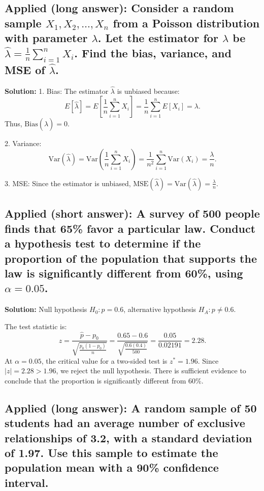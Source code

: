 \documentclass[12pt]{article}
\begin{document}
\subsection{Applied (long answer): Consider a random sample \( X_1, X_2, \dots, X_n \) from a Poisson distribution with parameter \( \lambda \). Let the estimator for \( \lambda \) be \( \hat{\lambda} = \frac{1}{n} \sum_{i=1}^{n} X_i \). Find the bias, variance, and MSE of \( \hat{\lambda} \).}

\textbf{Solution:}  
1. Bias:  
The estimator \( \hat{\lambda} \) is unbiased because:
\[
E[\hat{\lambda}] = E\left[ \frac{1}{n} \sum_{i=1}^{n} X_i \right] = \frac{1}{n} \sum_{i=1}^{n} E[X_i] = \lambda.
\]
Thus, \( \text{Bias}(\hat{\lambda}) = 0 \).

2. Variance:
\[
\text{Var}(\hat{\lambda}) = \text{Var}\left( \frac{1}{n} \sum_{i=1}^{n} X_i \right) = \frac{1}{n^2} \sum_{i=1}^{n} \text{Var}(X_i) = \frac{\lambda}{n}.
\]

3. MSE:
Since the estimator is unbiased, \( \text{MSE}(\hat{\lambda}) = \text{Var}(\hat{\lambda}) = \frac{\lambda}{n} \).

\subsection{Applied (short answer): A survey of 500 people finds that 65\% favor a particular law. Conduct a hypothesis test to determine if the proportion of the population that supports the law is significantly different from 60\%, using \( \alpha = 0.05 \).}

\textbf{Solution:}  
Null hypothesis \( H_0: p = 0.6 \), alternative hypothesis \( H_A: p \neq 0.6 \).

The test statistic is:
\[
z = \frac{\hat{p} - p_0}{\sqrt{\frac{p_0(1 - p_0)}{n}}} = \frac{0.65 - 0.6}{\sqrt{\frac{0.6(0.4)}{500}}} = \frac{0.05}{0.02191} = 2.28.
\]
At \( \alpha = 0.05 \), the critical value for a two-sided test is \( z^* = 1.96 \). Since \( |z| = 2.28 > 1.96 \), we reject the null hypothesis. There is sufficient evidence to conclude that the proportion is significantly different from 60\%.

\subsection{Applied (long answer): A random sample of 50 students had an average number of exclusive relationships of 3.2, with a standard deviation of 1.97. Use this sample to estimate the population mean with a 90\% confidence interval.}
\end{document}
